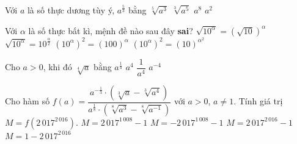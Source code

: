 

\begin{ex}%
	Với $a$ là số thực dương tùy  ý, $a^{\tfrac{5}{3}}$ bằng
	 \choice
		 {$\sqrt[5]{a^3}$}
		 {\True $\sqrt[3]{a^5}$}
		 {$a^8$}
		{$a^2$} 
\end{ex}

\begin{ex}%
	Với $\alpha $ là số thực bất kì, mệnh đề  nào sau đây \textbf{sai}?
	 \choice
		 {$\sqrt{10^{\alpha}}=\left(\sqrt{10}\right)^{\alpha}$}
		{$\sqrt{10^{\alpha}}=10^{\tfrac{\alpha}{2}}$} 
		{$\left(10^{\alpha}\right)^2=\left(100\right)^{\alpha}$} 
		{\True $\left(10^{\alpha}\right)^2=\left(10\right)^{\alpha^2}$} 
\end{ex}

\begin{ex}%
	 Cho $a>0$, khi đó $\sqrt[4]{a}$ bằng
	 \choice
		{\True $a^{\tfrac{1}{4}}$} 
		{$a^4$} 
		 {$\dfrac{1}{a^4}$}
		{$a^{-4}$} 
\end{ex}

\begin{ex}%
	Cho hàm số  $f(a)=\dfrac{a^{-\tfrac{1}{3}}\cdot\left(\sqrt[3]{a}-\sqrt[3]{a^4}\right)}{a^{\tfrac{1}{8}}\cdot\left(\sqrt[8]{a^3}-\sqrt[8]{a^{-1}}\right)}$ với $a>0$, $a\neq 1$. Tính giá trị $M=f\left(2\,017^{2\,016}\right)$.
	\choice 
		 {$M=2\,017^{1\,008}-1$}
		 {\True $M=-2\,017^{1\,008}-1$}
		{$M=2\,017^{2\,016}-1$} 
		 {$M=1-2\,017^{2\,016}$}
\end{ex}

